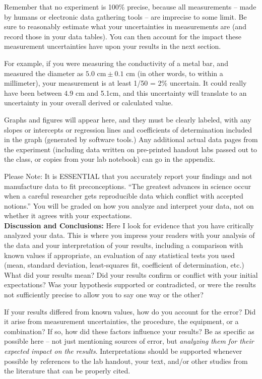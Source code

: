 \documentclass[11pt,letterpaper]{article}
\begin{document}
Remember that no experiment is 100\% precise, because all measurements – made by humans or electronic data gathering tools – are imprecise to some limit.  Be sure to reasonably estimate what your uncertainties in measurements are (and record those in your data tables). You can then account for the impact these measurement uncertainties have upon your results in the next section. 

For example, if you were measuring the conductivity of a metal bar, and measured the diameter as $5.0\mbox{ cm}\pm 0.1\mbox{ cm}$ (in other words, to within a millimeter), your measurement is at least 1/50 = 2\% uncertain.  It could really have been between 4.9 cm and 5.1cm, and this uncertainty will translate to an uncertainty in your overall derived or calculated value.

Graphs and figures will appear here, and they must be clearly labeled, with any slopes or intercepts or regression lines and coefficients of determination included in the graph (generated by software tools.) Any additional actual data pages from the experiment (including data written on pre-printed handout labs passed out to the class, or copies from your lab notebook) can go in the appendix.

Please Note: It is ESSENTIAL that you accurately report your findings and not manufacture data to fit preconceptions. ``The greatest advances in science occur when a careful researcher gets reproducible data which conflict with accepted notions.'' You will be graded on how you analyze and interpret your data, not on whether it agrees with your expectations.\\


\textbf{Discussion and Conclusions:} Here I look for evidence that you have critically analyzed your data. This is where you impress your readers with your analysis of the data and your interpretation of your results, including a comparison with known values if appropriate, an evaluation of any statistical tests you used (mean, standard deviation, least-squares fit, coefficient of determination, etc.) What did your results mean? Did your results confirm or conflict with your initial expectations? Was your hypothesis supported or contradicted, or were the results not sufficiently precise to allow you to say one way or the other? 
 
If your results differed from known values, how do you account for the error?  Did it arise from measurement uncertainties, the procedure, the equipment, or a combination?  If so, how did these factors influence your results?  Be as specific as possible here – not just mentioning sources of error, but \textit{analyzing them for their expected impact on the results}. Interpretations should be supported whenever possible by references to the lab handout, your text, and/or other studies from the literature that can be properly cited. 
\end{document}
